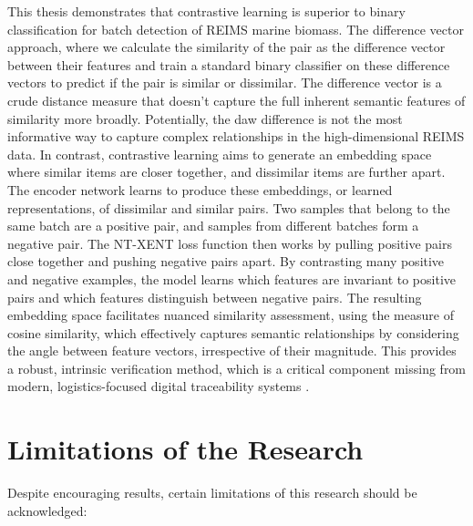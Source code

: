 This thesis demonstrates that contrastive learning is superior to binary classification for batch detection of REIMS marine biomass. The difference vector approach, where we calculate the similarity of the pair as the difference vector between their features and train a standard binary classifier on these difference vectors to predict if the pair is similar or dissimilar. The difference vector is a crude distance measure that doesn't capture the full inherent semantic features of similarity more broadly. Potentially, the daw difference is not the most informative way to capture complex relationships in the high-dimensional REIMS data. In contrast, contrastive learning aims to generate an embedding space where similar items are closer together, and dissimilar items are further apart. The encoder network learns to produce these embeddings, or learned representations, of dissimilar and similar pairs. Two samples that belong to the same batch are a positive pair, and samples from different batches form a negative pair. The NT-XENT loss function then works by pulling positive pairs close together and pushing negative pairs apart. By contrasting many positive and negative examples, the model learns which features are invariant to positive pairs and which features distinguish between negative pairs.
The resulting embedding space facilitates nuanced similarity assessment, using the measure of cosine similarity, which effectively captures semantic relationships by considering the angle between feature vectors, irrespective of their magnitude. This provides a robust, intrinsic verification method, which is a critical component missing from modern, logistics-focused digital traceability systems \citep{turkson2025digital, dahariya2025enhancing}.

\section{Limitations of the Research}

Despite encouraging results, certain limitations of this research should be acknowledged:

